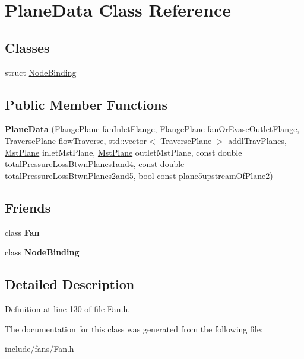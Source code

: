 \hypertarget{class_plane_data}{}\section{Plane\+Data Class Reference}
\label{class_plane_data}
\subsection*{Classes}
\begin{DoxyCompactItemize}
\item 
struct \hyperlink{struct_plane_data_1_1_node_binding}{Node\+Binding}
\end{DoxyCompactItemize}
\subsection*{Public Member Functions}
\begin{DoxyCompactItemize}
\item 
\mbox{\label{class_plane_data_a1ad5393fae6978e34f15d315b03f5525}} 
{\bfseries Plane\+Data} (\hyperlink{class_flange_plane}{Flange\+Plane} fan\+Inlet\+Flange, \hyperlink{class_flange_plane}{Flange\+Plane} fan\+Or\+Evase\+Outlet\+Flange, \hyperlink{class_traverse_plane}{Traverse\+Plane} flow\+Traverse, std\+::vector$<$ \hyperlink{class_traverse_plane}{Traverse\+Plane} $>$ addl\+Trav\+Planes, \hyperlink{class_mst_plane}{Mst\+Plane} inlet\+Mst\+Plane, \hyperlink{class_mst_plane}{Mst\+Plane} outlet\+Mst\+Plane, const double total\+Pressure\+Loss\+Btwn\+Planes1and4, const double total\+Pressure\+Loss\+Btwn\+Planes2and5, bool const plane5upstream\+Of\+Plane2)
\end{DoxyCompactItemize}
\subsection*{Friends}
\begin{DoxyCompactItemize}
\item 
\mbox{\label{class_plane_data_a0a305abd4183ca4b5d3adb1b563378d7}} 
class {\bfseries Fan}
\item 
\mbox{\label{class_plane_data_a6a20107b7f65dbce50aef82a1dcc5ca6}} 
class {\bfseries Node\+Binding}
\end{DoxyCompactItemize}


\subsection{Detailed Description}


Definition at line 130 of file Fan.\+h.



The documentation for this class was generated from the following file\+:\begin{DoxyCompactItemize}
\item 
include/fans/Fan.\+h\end{DoxyCompactItemize}
